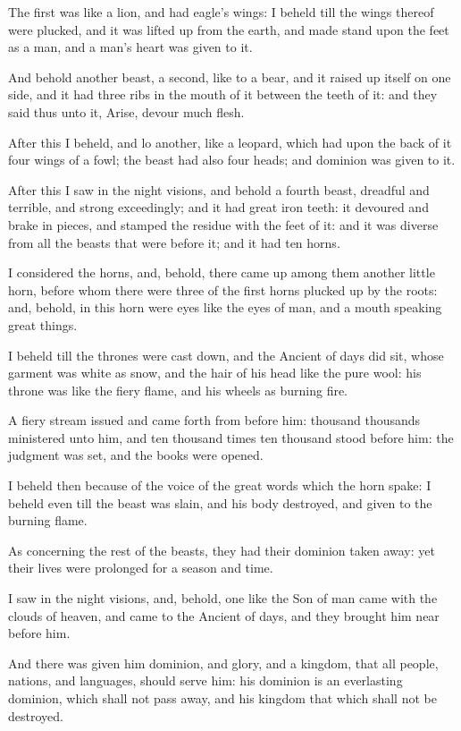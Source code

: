 \verse The first was like a lion, and had eagle's wings: I beheld till the wings thereof were plucked, and it was lifted up from the earth, and made stand upon the feet as a man, and a man's heart was given to it.

\verse And behold another beast, a second, like to a bear, and it raised up itself on one side, and it had three ribs in the mouth of it between the teeth of it: and they said thus unto it, Arise, devour much flesh.

\verse After this I beheld, and lo another, like a leopard, which had upon the back of it four wings of a fowl; the beast had also four heads; and dominion was given to it.

\verse After this I saw in the night visions, and behold a fourth beast, dreadful and terrible, and strong exceedingly; and it had great iron teeth: it devoured and brake in pieces, and stamped the residue with the feet of it: and it was diverse from all the beasts that were before it; and it had ten horns.

\verse I considered the horns, and, behold, there came up among them another little horn, before whom there were three of the first horns plucked up by the roots: and, behold, in this horn were eyes like the eyes of man, and a mouth speaking great things.

\verse I beheld till the thrones were cast down, and the Ancient of days did sit, whose garment was white as snow, and the hair of his head like the pure wool: his throne was like the fiery flame, and his wheels as burning fire.

\verse A fiery stream issued and came forth from before him: thousand thousands ministered unto him, and ten thousand times ten thousand stood before him: the judgment was set, and the books were opened.

\verse I beheld then because of the voice of the great words which the horn spake: I beheld even till the beast was slain, and his body destroyed, and given to the burning flame.

\verse As concerning the rest of the beasts, they had their dominion taken away: yet their lives were prolonged for a season and time.

\verse I saw in the night visions, and, behold, one like the Son of man came with the clouds of heaven, and came to the Ancient of days, and they brought him near before him.

\verse And there was given him dominion, and glory, and a kingdom, that all people, nations, and languages, should serve him: his dominion is an everlasting dominion, which shall not pass away, and his kingdom that which shall not be destroyed.

